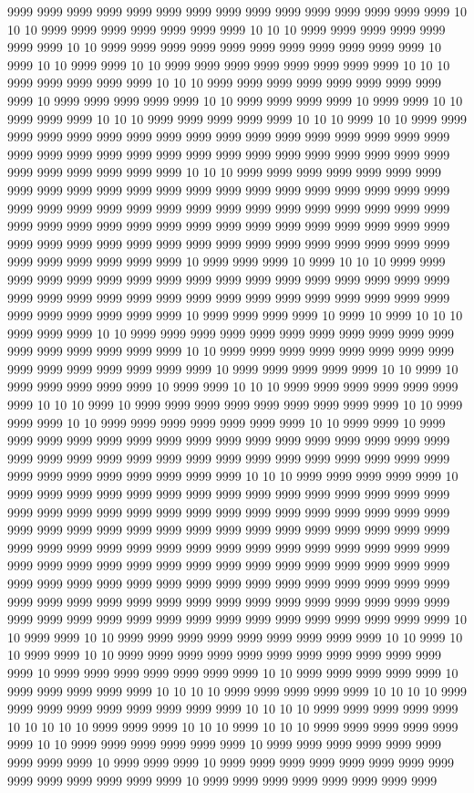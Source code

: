 9999 9999 9999 9999 9999 9999 9999 9999 9999 9999 9999 9999 9999 9999 9999 10 10 10 9999 9999 9999 9999 9999 9999 9999 10 10 10 9999 9999 9999 9999 9999 9999 9999 10 10 9999 9999 9999 9999 9999 9999 9999 9999 9999 9999 9999 10 9999 10 10 9999 9999 10 10 9999 9999 9999 9999 9999 9999 9999 9999 10 10 10 9999 9999 9999 9999 9999 10 10 10 9999 9999 9999 9999 9999 9999 9999 9999 9999 10 9999 9999 9999 9999 9999 10 10 9999 9999 9999 9999 10 9999 9999 10 10 9999 9999 9999 10 10 10 9999 9999 9999 9999 9999 10 10 10 9999 10 10 9999 9999 9999 9999 9999 9999 9999 9999 9999 9999 9999 9999 9999 9999 9999 9999 9999 9999 9999 9999 9999 9999 9999 9999 9999 9999 9999 9999 9999 9999 9999 9999 9999 9999 9999 9999 9999 9999 10 10 10 9999 9999 9999 9999 9999 9999 9999 9999 9999 9999 9999 9999 9999 9999 9999 9999 9999 9999 9999 9999 9999 9999 9999 9999 9999 9999 9999 9999 9999 9999 9999 9999 9999 9999 9999 9999 9999 9999 9999 9999 9999 9999 9999 9999 9999 9999 9999 9999 9999 9999 9999 9999 9999 9999 9999 9999 9999 9999 9999 9999 9999 9999 9999 9999 9999 9999 9999 9999 9999 9999 9999 9999 9999 10 9999 9999 9999 10 9999 10 10 10 9999 9999 9999 9999 9999 9999 9999 9999 9999 9999 9999 9999 9999 9999 9999 9999 9999 9999 9999 9999 9999 9999 9999 9999 9999 9999 9999 9999 9999 9999 9999 9999 9999 9999 9999 9999 9999 9999 10 9999 9999 9999 9999 10 9999 10 9999 10 10 10 9999 9999 9999 10 10 9999 9999 9999 9999 9999 9999 9999 9999 9999 9999 9999 9999 9999 9999 9999 9999 9999 10 10 9999 9999 9999 9999 9999 9999 9999 9999 9999 9999 9999 9999 9999 9999 9999 10 9999 9999 9999 9999 9999 10 10 9999 10 9999 9999 9999 9999 9999 10 9999 9999 10 10 10 9999 9999 9999 9999 9999 9999 9999 10 10 10 9999 10 9999 9999 9999 9999 9999 9999 9999 9999 9999 10 10 9999 9999 9999 10 10 9999 9999 9999 9999 9999 9999 9999 10 10 9999 9999 10 9999 9999 9999 9999 9999 9999 9999 9999 9999 9999 9999 9999 9999 9999 9999 9999 9999 9999 9999 9999 9999 9999 9999 9999 9999 9999 9999 9999 9999 9999 9999 9999 9999 9999 9999 9999 9999 9999 9999 10 10 10 9999 9999 9999 9999 9999 10 9999 9999 9999 9999 9999 9999 9999 9999 9999 9999 9999 9999 9999 9999 9999 9999 9999 9999 9999 9999 9999 9999 9999 9999 9999 9999 9999 9999 9999 9999 9999 9999 9999 9999 9999 9999 9999 9999 9999 9999 9999 9999 9999 9999 9999 9999 9999 9999 9999 9999 9999 9999 9999 9999 9999 9999 9999 9999 9999 9999 9999 9999 9999 9999 9999 9999 9999 9999 9999 9999 9999 9999 9999 9999 9999 9999 9999 9999 9999 9999 9999 9999 9999 9999 9999 9999 9999 9999 9999 9999 9999 9999 9999 9999 9999 9999 9999 9999 9999 9999 9999 9999 9999 9999 9999 9999 9999 9999 9999 9999 9999 9999 9999 9999 9999 9999 9999 9999 9999 9999 10 10 9999 9999 10 10 9999 9999 9999 9999 9999 9999 9999 9999 9999 10 10 9999 10 10 9999 9999 10 10 9999 9999 9999 9999 9999 9999 9999 9999 9999 9999 9999 9999 10 9999 9999 9999 9999 9999 9999 9999 10 10 9999 9999 9999 9999 9999 10 9999 9999 9999 9999 9999 10 10 10 10 9999 9999 9999 9999 9999 10 10 10 10 9999 9999 9999 9999 9999 9999 9999 9999 9999 10 10 10 10 9999 9999 9999 9999 9999 10 10 10 10 10 9999 9999 9999 10 10 10 9999 10 10 10 9999 9999 9999 9999 9999 9999 10 10 9999 9999 9999 9999 9999 9999 10 9999 9999 9999 9999 9999 9999 9999 9999 9999 10 9999 9999 9999 10 9999 9999 9999 9999 9999 9999 9999 9999 9999 9999 9999 9999 9999 9999 10 9999 9999 9999 9999 9999 9999 9999 9999 
